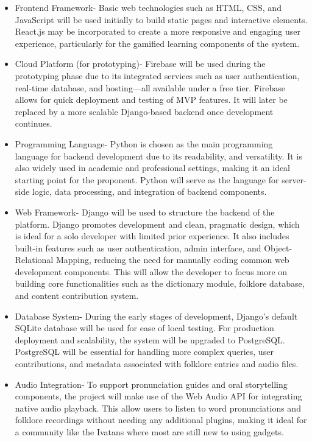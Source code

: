                 \begin{itemize}
                \item Frontend Framework- Basic web technologies such as HTML, CSS, and JavaScript will be used initially to build static pages and interactive elements. React.js may be incorporated to create a more responsive and engaging user experience, particularly for the gamified learning components of the system.
                \item Cloud Platform (for prototyping)- Firebase will be used during the prototyping phase due to its integrated services such as user authentication, real-time database, and hosting—all available under a free tier. Firebase allows for quick deployment and testing of MVP features. It will later be replaced by a more scalable Django-based backend once development continues.
                \item Programming Language- Python is chosen as the main programming language for backend development due to its readability, and versatility. It is also widely used in academic and professional settings, making it an ideal starting point for the proponent. Python will serve as the language for server-side logic, data processing, and integration of backend components.
                \item Web Framework- Django will be used to structure the backend of the platform. Django promotes development and clean, pragmatic design, which is ideal for a solo developer with limited prior experience. It also includes built-in features such as user authentication, admin interface, and Object-Relational Mapping, reducing the need for manually coding common web development components. This will allow the developer to focus more on building core functionalities such as the dictionary module, folklore database, and content contribution system.
                \item Database System- During the early stages of development, Django’s default SQLite database will be used for ease of local testing. For production deployment and scalability, the system will be upgraded to PostgreSQL. PostgreSQL will be essential for handling more complex queries, user contributions, and metadata associated with folklore entries and audio files.
                \item Audio Integration- To support pronunciation guides and oral storytelling components, the project will make use of the Web Audio API for integrating native audio playback. This allow users to listen to word pronunciations and folklore recordings without needing any additional plugins, making it ideal for a community like the Ivatans where most are still new to using gadgets. 

\end{itemize}

